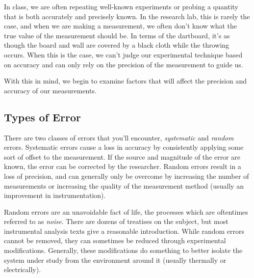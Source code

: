 In class, we are often repeating well-known experiments or probing a quantity that is both accurately and precisely known. 
In the research lab, this is rarely the case, and when we are making a measurement, we often don't know what the true value of the measurement should be. 
In terms of the dartboard, it's as though the board and wall are covered by a black cloth while the throwing occurs. 
When this is the case, we can't judge our experimental technique based on accuracy and can only rely on the precision of the measurement to guide us. 

With this in mind, we begin to examine factors that will affect the precision and accuracy of our measurements. 


\subsection{Types of Error} %
\label{sub:types_of_error}

There are two classes of errors that you'll encounter, \emph{systematic} and \emph{random} errors. 
Systematic errors cause a loss in accuracy by consistently applying some sort of offset to the measurement. 
If the source and magnitude of the error are known, the error can be corrected by the researcher. 
Random errors result in a loss of precision, and can generally only be overcome by increasing the number of measurements or increasing the quality of the measurement method (usually an improvement in instrumentation). 

Random errors are an unavoidable fact of life, the processes which are oftentimes referred to as \emph{noise}. 
There are dozens of treatises on the subject, but most instrumental analysis texts give a reasonable introduction. 
While random errors cannot be removed, they can sometimes be reduced through experimental modifications. 
Generally, these modifications do something to better isolate the system under study from the environment around it (usually thermally or electrically). 

